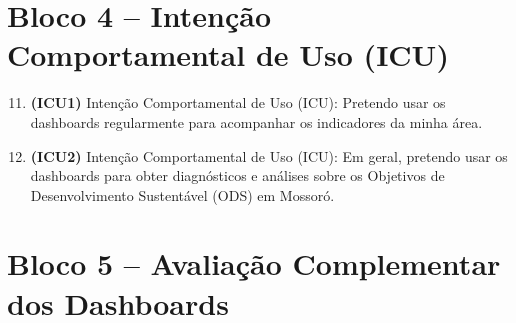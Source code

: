 \section*{Bloco 4 -- Intenção Comportamental de Uso (ICU)}

\begin{enumerate}
    \setcounter{enumi}{10}
    \item \textbf{(ICU1)} Intenção Comportamental de Uso (ICU): Pretendo usar os dashboards regularmente para acompanhar os indicadores da minha área.
    \item \textbf{(ICU2)} Intenção Comportamental de Uso (ICU): Em geral, pretendo usar os dashboards para obter diagnósticos e análises sobre os Objetivos de Desenvolvimento Sustentável (ODS) em Mossoró.
\end{enumerate}

\section*{Bloco 5 -- Avaliação Complementar dos Dashboards}

